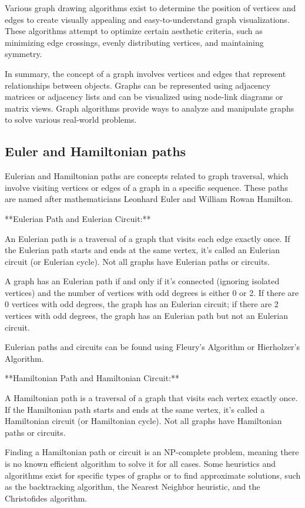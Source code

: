 \documentclass{article}
\begin{document}
Various graph drawing algorithms exist to determine the position of vertices and edges to create visually appealing and easy-to-understand graph visualizations. These algorithms attempt to optimize certain aesthetic criteria, such as minimizing edge crossings, evenly distributing vertices, and maintaining symmetry.

In summary, the concept of a graph involves vertices and edges that represent relationships between objects. Graphs can be represented using adjacency matrices or adjacency lists and can be visualized using node-link diagrams or matrix views. Graph algorithms provide ways to analyze and manipulate graphs to solve various real-world problems.


\subsection{Euler and Hamiltonian paths}

Eulerian and Hamiltonian paths are concepts related to graph traversal, which involve visiting vertices or edges of a graph in a specific sequence. These paths are named after mathematicians Leonhard Euler and William Rowan Hamilton.

**Eulerian Path and Eulerian Circuit:**

An Eulerian path is a traversal of a graph that visits each edge exactly once. If the Eulerian path starts and ends at the same vertex, it's called an Eulerian circuit (or Eulerian cycle). Not all graphs have Eulerian paths or circuits.

A graph has an Eulerian path if and only if it's connected (ignoring isolated vertices) and the number of vertices with odd degrees is either 0 or 2. If there are 0 vertices with odd degrees, the graph has an Eulerian circuit; if there are 2 vertices with odd degrees, the graph has an Eulerian path but not an Eulerian circuit.

Eulerian paths and circuits can be found using Fleury's Algorithm or Hierholzer's Algorithm.

**Hamiltonian Path and Hamiltonian Circuit:**

A Hamiltonian path is a traversal of a graph that visits each vertex exactly once. If the Hamiltonian path starts and ends at the same vertex, it's called a Hamiltonian circuit (or Hamiltonian cycle). Not all graphs have Hamiltonian paths or circuits.

Finding a Hamiltonian path or circuit is an NP-complete problem, meaning there is no known efficient algorithm to solve it for all cases. Some heuristics and algorithms exist for specific types of graphs or to find approximate solutions, such as the backtracking algorithm, the Nearest Neighbor heuristic, and the Christofides algorithm.
\end{document}
